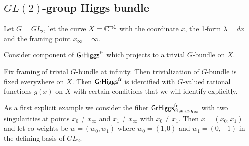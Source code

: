 \documentclass[12pt,psamsfonts,reqno]{amsart}
\begin{document}
\subsection{$GL(2)$-group Higgs bundle}

Let $G=GL_2$, let the curve $X = \mathbb C \mathbb P^1$ with the coordinate $x$, the 1-form
$\lambda = dx$ and the framing point $x_\infty = \infty$.

Consider component of $\mathsf{GrHiggs}^{\mathrm{fr}}$ which projects to a trivial $G$-bundle on $X$.

Fix framing of trivial $G$-bundle at infinity. Then trivialization of $G$-bundle is fixed everywhere on $X$. Then $\mathsf{GrHiggs}^{\mathrm{fr}}$ is identified with $G$-valued
rational functions $g(x)$ on $X$ with certain conditions that we will identify explicitly.


As a first explicit example we consider the fiber $\mathsf{GrHiggs}^{\mathrm{fr}}_{G, \underline{x}, \underline{w}, g_\infty}$ with two singularities at points $x_0 \neq x_\infty$ and $x_1\neq x_\infty$ with $x_0 \neq x_1$.  
 Then $\underline{x}=(x_0,x_1)$ and let 
 co-weights be $\underline{w} = (w_0, w_1)$ where $w_0 = (1,0)$ and $w_1 = (0,-1)$ in the defining basis of $GL_2$.
\end{document}
